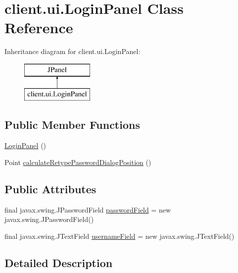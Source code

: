 \hypertarget{classclient_1_1ui_1_1_login_panel}{}\section{client.\+ui.\+Login\+Panel Class Reference}
\label{classclient_1_1ui_1_1_login_panel}
Inheritance diagram for client.\+ui.\+Login\+Panel\+:\begin{figure}[H]
\begin{center}
\leavevmode
\includegraphics[height=2.000000cm]{classclient_1_1ui_1_1_login_panel}
\end{center}
\end{figure}
\subsection*{Public Member Functions}
\begin{DoxyCompactItemize}
\item 
\hyperlink{classclient_1_1ui_1_1_login_panel_a697f38b937f048e562c634c713d90885}{Login\+Panel} ()
\item 
Point \hyperlink{classclient_1_1ui_1_1_login_panel_a9726aa2bc3416aa22ad43d2b4b9eed70}{calculate\+Retype\+Password\+Dialog\+Position} ()
\end{DoxyCompactItemize}
\subsection*{Public Attributes}
\begin{DoxyCompactItemize}
\item 
final javax.\+swing.\+J\+Password\+Field \hyperlink{classclient_1_1ui_1_1_login_panel_a4b3258e8faace6462f58c79cb4a08835}{password\+Field} = new javax.\+swing.\+J\+Password\+Field()
\item 
final javax.\+swing.\+J\+Text\+Field \hyperlink{classclient_1_1ui_1_1_login_panel_a3a01950b4312782aa5d78d22d257e19e}{username\+Field} = new javax.\+swing.\+J\+Text\+Field()
\end{DoxyCompactItemize}


\subsection{Detailed Description}


